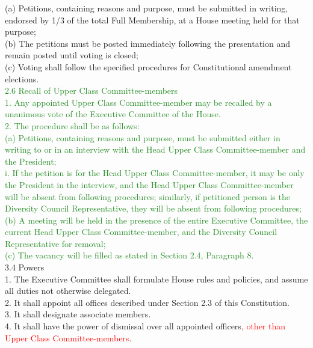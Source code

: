 \documentclass[10pt]{article} %
\begin{document}
\begin{itemize}
	(a) Petitions, containing reasons and purpose, must be submitted in writing, endorsed by 1/3 of the total Full Membership, at a House meeting held for that purpose; \\
	(b) The petitions must be posted immediately following the presentation and remain posted until voting is closed; \\
	(c) Voting shall follow the specified procedures for Constitutional amendment elections. \\
	\textcolor{ForestGreen}{2.6 Recall of Upper Class Committee-members} \\
	\textcolor{ForestGreen}{1. Any appointed Upper Class Committee-member may be recalled by a unanimous vote of the Executive Committee of the House.} \\
	\textcolor{ForestGreen}{2. The procedure shall be as follows:} \\
	\textcolor{ForestGreen}{(a) Petitions, containing reasons and purpose, must be submitted either in writing to or in an interview with the Head Upper Class Committee-member and the President;} \\
	\textcolor{ForestGreen}{i. If the petition is for the Head Upper Class Committee-member, it may be only the President in the interview, and the Head Upper Class Committee-member will be absent from following procedures; similarly, if petitioned person is the Diversity Council Representative, they will be absent from following procedures;} \\
	\textcolor{ForestGreen}{(b) A meeting will be held in the presence of the entire Executive Committee, the current Head Upper Class Committee-member, and the Diversity Council Representative for removal;} \\
	\textcolor{ForestGreen}{(c) The vacancy will be filled as stated in Section 2.4, Paragraph 8.} \\
	3.4 Powers \\
	1. The Executive Committee shall formulate House rules and policies, and assume all duties not otherwise delegated. \\
	2. It shall appoint all offices described under Section 2.3 of this Constitution. \\
	3. It shall designate associate members. \\
	4. It shall have the power of dismissal over all appointed officers\textcolor{red}{, other than Upper Class Committee-members}.
\end{itemize}
\end{document}
